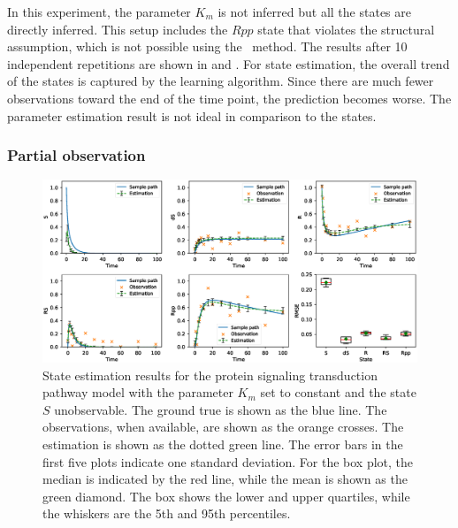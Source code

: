 In this experiment, the parameter $K_m$ is not inferred but all the states are directly inferred.
This setup includes the $Rpp$ state that violates the structural assumption, which is not possible using the \algovgmgp\ method.
The results after 10 independent repetitions are shown in  and .
For state estimation, the overall trend of the states is captured by the learning algorithm.
Since there are much fewer observations toward the end of the time point, the prediction becomes worse.
The parameter estimation result is not ideal in comparison to the states.

\subsubsection*{Partial observation}

\begin{figure}
    \centering
    \includegraphics[width=\textwidth]{graphics/protein-states-partial-without-km}
    \caption{State estimation results for the protein signaling transduction pathway model with the parameter $K_m$ set to constant and the state $S$ unobservable. The ground true is shown as the blue line. The observations, when available, are shown as the orange crosses. The estimation is shown as the dotted green line. The error bars in the first five plots indicate one standard deviation. For the box plot, the median is indicated by the red line, while the mean is shown as the green diamond. The box shows the lower and upper quartiles, while the whiskers are the 5th and 95th percentiles.}
    \label{fig-protein-states-partial-without-km}
\end{figure}

